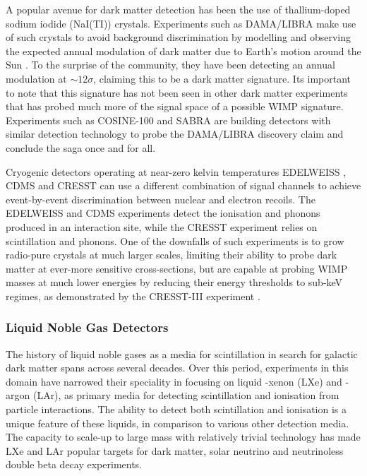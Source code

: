 {A popular avenue for dark matter detection has been the use of thallium-doped sodium iodide (NaI(TI)) crystals. Experiments such as DAMA/LIBRA make use of such crystals to avoid background discrimination by modelling and observing the expected annual modulation of dark matter due to Earth's motion around the Sun \cite{dama_libra, dama_libra_new}. To the surprise of the community, they have been detecting an annual modulation at $\sim12\sigma$, claiming this to be a dark matter signature. Its important to note that this signature has not been seen in other dark matter experiments that has probed much more of the signal space of a possible WIMP signature. Experiments such as COSINE-100 \cite{cosine_100} and SABRA \cite{sabre} are building detectors with similar detection technology to probe the DAMA/LIBRA discovery claim and conclude the saga once and for all. 

Cryogenic detectors operating at near-zero kelvin temperatures EDELWEISS \cite{edelweiss}, CDMS \cite{cdms} and CRESST \cite{cresst} can use a different combination of signal channels to achieve event-by-event discrimination between nuclear and electron recoils. The EDELWEISS and CDMS experiments detect the ionisation and phonons produced in an interaction site, while the CRESST experiment relies on scintillation and phonons. One of the downfalls of such experiments is to grow radio-pure crystals at much larger scales, limiting their ability to probe dark matter at ever-more sensitive cross-sections, but are capable at probing WIMP masses at much lower energies by reducing their energy thresholds to sub-keV regimes, as demonstrated by the CRESST-III experiment \cite{cresst_3}. 

\subsubsection{Liquid Noble Gas Detectors}
\label{subsec:liquid_noble_gas}

The history of liquid noble gases as a media for scintillation in search for galactic dark matter spans across several decades. Over this period, experiments in this domain have narrowed their speciality in focusing on liquid -xenon (LXe) and -argon (LAr), as primary media for detecting scintillation and ionisation from particle interactions. The ability to detect both scintillation and ionisation is a unique feature of these liquids, in comparison to various other detection media. The capacity to scale-up to large mass with relatively trivial technology has made LXe and LAr popular targets for dark matter, solar neutrino and neutrinoless double beta decay experiments. 

}
